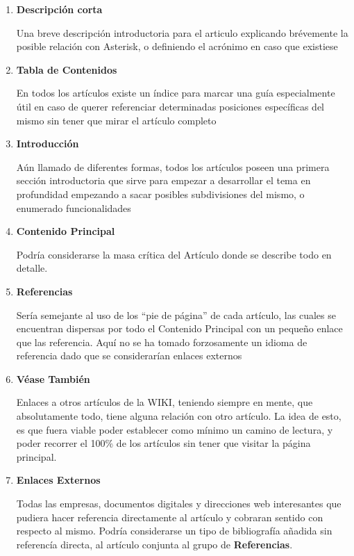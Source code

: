 \begin{enumerate}
	  \setlength{\itemsep}{10pt}

	\item \textbf{Descripción corta} 
	
	Una breve descripción introductoria para el articulo explicando brévemente la posible relación con Asterisk, o definiendo el acrónimo en caso que existiese
	
	\item \textbf{Tabla de Contenidos} 
	
	En todos los artículos existe un índice para marcar una guía especialmente útil en caso de querer referenciar determinadas posiciones específicas del mismo sin tener que mirar el artículo completo
  
	\item \textbf{Introducción} 
	
  Aún llamado de diferentes formas, todos los artículos poseen una primera sección introductoria que sirve para empezar a desarrollar el tema en profundidad empezando a sacar posibles subdivisiones del mismo, o enumerado funcionalidades
 
  \item \textbf{Contenido Principal} 
	
	Podría considerarse la masa crítica del Artículo donde se describe todo en detalle.
  
	\item \textbf{Referencias} 
	
	Sería semejante al uso de los ``pie de página'' de cada artículo, las cuales se encuentran dispersas por todo el Contenido Principal con un pequeño enlace que las referencia. Aquí no se ha tomado forzosamente un idioma de referencia dado que se considerarían enlaces externos

 	\item \textbf{Véase También} 
	
	Enlaces a otros artículos de la WIKI, teniendo siempre en mente, que absolutamente todo, tiene alguna relación con otro artículo. La idea de esto, es que fuera viable poder establecer como mínimo un camino de lectura, y poder recorrer el 100\% de los artículos sin tener que visitar la página principal.
	
	\item \textbf{Enlaces Externos} 
	
	Todas las empresas, documentos digitales y direcciones web interesantes que pudiera hacer referencia directamente al artículo y cobraran sentido con respecto al mismo. Podría considerarse un tipo de bibliografía añadida sin referencía directa, al artículo conjunta al grupo de \textbf{Referencias}.

\end{enumerate}

